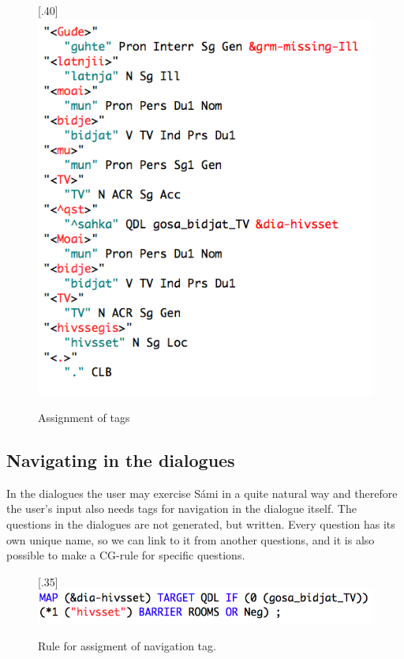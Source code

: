 \documentclass[11pt]{article}
\begin{document}
\begin{figure}%
\begin{center}
\scalebox{.40}[.40]{\includegraphics{presentation/img/hivssegisCGanal.png}}\\
\caption{Assignment of tags}
\end{center}
\end{figure}

\subsection{Navigating in the dialogues}
In the dialogues the user may exercise Sámi in a quite natural way and therefore the user's input also needs tags for navigation in the dialogue itself. The questions in the dialogues are not generated, but written. Every question has its own unique name, so we can link to it from another questions, and it is also possible to make a CG-rule for specific questions.   

\begin{figure}%
\begin{center}
\scalebox{.35}[.35]{\includegraphics{presentation/img/hivsset_tag.png}}\\
\caption{Rule for assigment of navigation tag.}
\end{center}
\end{figure}
\end{document}
